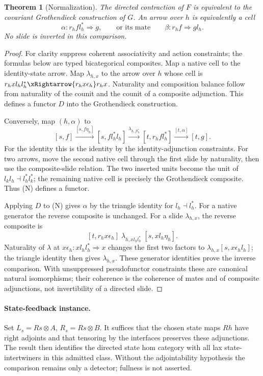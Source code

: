 \documentclass[11pt]{article}
\newtheorem{theorem}{Theorem}
\begin{document}
\begin{theorem}[Normalization]
The directed contraction of $F$ is equivalent to the covariant Grothendieck construction of $G$. An arrow over $h$ is equivalently a cell
\[
 \alpha:r_h f l_h^*\Rightarrow g,
 \qquad\text{or its mate}\qquad
 \beta:r_h f\Rightarrow g l_h.
\]
No slide is inverted in this comparison.
\end{theorem}
\begin{proof}
For clarity suppress coherent associativity and action constraints; the formulas below are typed bicategorical composites. Map a native cell to the identity-state arrow. Map $\lambda_{h,x}$ to the arrow over $h$ whose cell is
$r_h x l_h l_h^*\xRightarrow{r_hx\epsilon_h}r_hx$.
Naturality and composition balance follow from naturality of the counit and the counit of a composite adjunction. This defines a functor $D$ into the Grothendieck construction.

Conversely, map $(h,\alpha)$ to
\[
 [s,f]\xrightarrow{[s,f\eta_h]}
 [s,f l_h^*l_h]\xrightarrow{\lambda_{h,f l_h^*}}
 [t,r_h f l_h^*]\xrightarrow{[t,\alpha]}[t,g].
\tag{N}
\]
For the identity this is the identity by the identity-adjunction constraints. For two arrows, move the second native cell through the first slide by naturality, then use the composite-slide relation. The two inserted units become the unit of $l_kl_h\dashv l_h^*l_k^*$; the remaining native cell is precisely the Grothendieck composite. Thus (N) defines a functor.

Applying $D$ to (N) gives $\alpha$ by the triangle identity for $l_h\dashv l_h^*$. For a native generator the reverse composite is unchanged. For a slide $\lambda_{h,x}$, the reverse composite is
\[
 [t,r_hx\epsilon_h]\;\lambda_{h,x l_h l_h^*}\;[s,x l_h\eta_h].
\]
Naturality of $\lambda$ at $x\epsilon_h:x l_h l_h^*\Rightarrow x$ changes the first two factors to
$\lambda_{h,x}[s,x\epsilon_h l_h]$; the triangle identity then gives $\lambda_{h,x}$. These generator identities prove the inverse comparison. With unsuppressed pseudofunctor constraints these are canonical natural isomorphisms; their coherence is the coherence of mates and of composite adjunctions, not invertibility of a directed slide.
\end{proof}

\paragraph{State-feedback instance.} Set $L_s=Rs\otimes A$, $R_s=Rs\otimes B$. It suffices that the chosen state maps $Rh$ have right adjoints and that tensoring by the interfaces preserves these adjunctions. The result then identifies the directed state hom category with all lax state-intertwiners in this admitted class. Without the adjointability hypothesis the comparison remains only a detector; fullness is not asserted.
\end{document}
